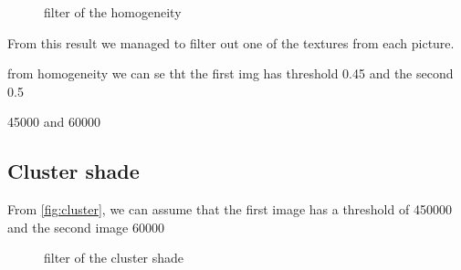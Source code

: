\documentclass{article}
\begin{document}
		 
\begin{figure}[h]%
		\centering
	    \qquad
	    \caption{filter of the homogeneity}%
    	\label{fig:homofilter}%
\end{figure}	

From this result we managed to filter out one of the textures from each picture.
	

	 
	 from homogeneity we can se tht the first img has threshold 0.45 and the second 0.5
	 
	 45000 and 60000

\newpage
\subsection{Cluster shade}
	From \ref{fig:cluster}, we can assume that the first image has a threshold of 450000 and the second image 60000
		 
		 
\begin{figure}[h]%
		\centering
	    \qquad
	    \caption{filter of the cluster shade}%
    	\label{fig:clusterfilter}%
\end{figure}	
\newpage
\end{document}
